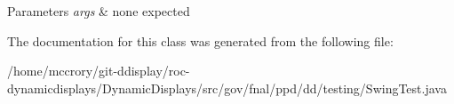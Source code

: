\begin{DoxyParams}{Parameters}
{\em args} & none expected \\
\hline
\end{DoxyParams}


The documentation for this class was generated from the following file\-:\begin{DoxyCompactItemize}
\item 
/home/mccrory/git-\/ddisplay/roc-\/dynamicdisplays/\-Dynamic\-Displays/src/gov/fnal/ppd/dd/testing/Swing\-Test.\-java\end{DoxyCompactItemize}
